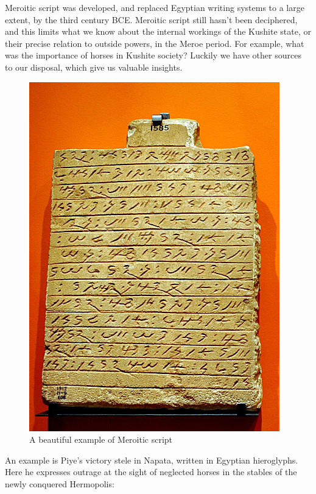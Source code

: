 \documentclass[a4paper,12pt]{scrreprt}
\begin{document}
Meroitic script was developed, and replaced Egyptian writing systems to a large extent, by the third century BCE. Meroitic script still hasn’t been deciphered, and this limits what we know about the internal workings of the Kushite state, or their precise relation to outside powers, in the Meroe period. For example, what was the importance of horses in Kushite society? Luckily we have other sources to our disposal, which give us valuable insights.

\begin{figure}[H]
	\centering
	\includegraphics[width=\textwidth]{img/merodic_script}
	\caption{A beautiful example of Meroitic script}
\end{figure}

An example is Piye’s victory stele in Napata, written in Egyptian hieroglyphs. Here he expresses outrage at the sight of neglected horses in the stables of the newly conquered Hermopolis:\\
\end{document}
